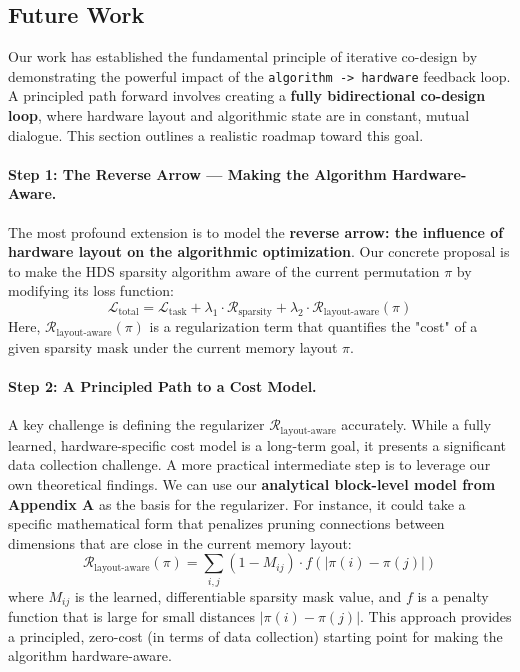 \documentclass{article}
\begin{document}
\subsection{Future Work}
Our work has established the fundamental principle of iterative co-design by demonstrating the powerful impact of the \texttt{algorithm -> hardware} feedback loop. A principled path forward involves creating a \textbf{fully bidirectional co-design loop}, where hardware layout and algorithmic state are in constant, mutual dialogue. This section outlines a realistic roadmap toward this goal.

\paragraph{Step 1: The Reverse Arrow — Making the Algorithm Hardware-Aware.}
The most profound extension is to model the \textbf{reverse arrow: the influence of hardware layout on the algorithmic optimization}. Our concrete proposal is to make the HDS sparsity algorithm aware of the current permutation $\pi$ by modifying its loss function:
\begin{equation}
\label{eq:bidirectional_loss}
\mathcal{L}_{\text{total}} = \mathcal{L}_{\text{task}} + \lambda_1 \cdot \mathcal{R}_{\text{sparsity}} + \lambda_2 \cdot \mathcal{R}_{\text{layout-aware}}(\pi)
\end{equation}
Here, $\mathcal{R}_{\text{layout-aware}}(\pi)$ is a regularization term that quantifies the "cost" of a given sparsity mask under the current memory layout $\pi$.

\paragraph{Step 2: A Principled Path to a Cost Model.}
A key challenge is defining the regularizer $\mathcal{R}_{\text{layout-aware}}$ accurately. While a fully learned, hardware-specific cost model is a long-term goal, it presents a significant data collection challenge. A more practical intermediate step is to leverage our own theoretical findings. We can use our \textbf{analytical block-level model from Appendix A} as the basis for the regularizer. For instance, it could take a specific mathematical form that penalizes pruning connections between dimensions that are close in the current memory layout:
\begin{equation}
\label{eq:layout_aware_reg}
\mathcal{R}_{\text{layout-aware}}(\pi) = \sum_{i,j} (1 - M_{ij}) \cdot f(|\pi(i) - \pi(j)|)
\end{equation}
where $M_{ij}$ is the learned, differentiable sparsity mask value, and $f$ is a penalty function that is large for small distances $|\pi(i) - \pi(j)|$. This approach provides a principled, zero-cost (in terms of data collection) starting point for making the algorithm hardware-aware.
\end{document}
